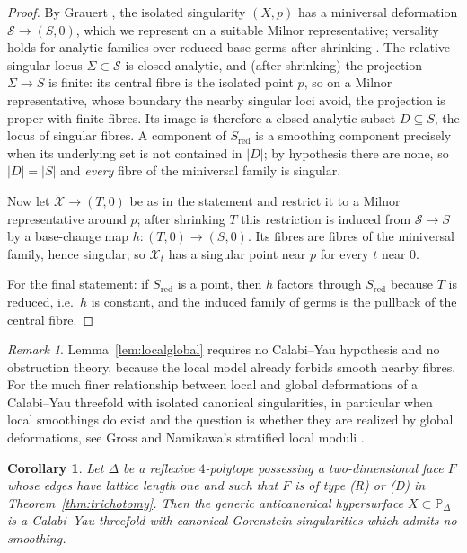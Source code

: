\documentclass[11pt]{amsart}
\newtheorem{corollary}[theorem]{Corollary}
\theoremstyle{definition}
\theoremstyle{remark}
\newtheorem{remark}[theorem]{Remark}
\newcommand{\PP}{\mathbb{P}}
\begin{document}
\begin{proof}
By Grauert \cite{Grauert72}, the isolated singularity $(X,p)$ has a miniversal
deformation $\mathcal{S} \to (S,0)$, which we represent on a suitable Milnor
representative; versality holds for analytic families over reduced base germs
after shrinking \cite[II.1]{GLS}.  The relative singular locus
$\Sigma \subset \mathcal{S}$ is closed analytic, and (after shrinking) the
projection $\Sigma \to S$ is finite: its central fibre is the
isolated point $p$, so on a Milnor representative, whose boundary the
nearby singular loci avoid, the projection is proper with finite
fibres.  Its image is therefore a closed analytic subset
$D \subseteq S$, the locus of singular fibres.  A component of
$S_{\mathrm{red}}$ is a smoothing component precisely when its underlying set is not
contained in $|D|$; by hypothesis there are none, so $|D|=|S|$ and
\emph{every} fibre of the miniversal family is singular.

Now let $\mathcal{X} \to (T,0)$ be as in the statement and restrict it to a
Milnor representative around $p$; after shrinking $T$ this restriction is
induced from $\mathcal{S} \to S$ by a base-change map $h : (T,0) \to (S,0)$.
Its fibres are fibres of the miniversal family, hence singular; so
$\mathcal{X}_t$ has a singular point near $p$ for every $t$ near $0$.

For the final statement: if $S_{\mathrm{red}}$ is a point, then $h$ factors
through $S_{\mathrm{red}}$ because $T$ is reduced, i.e.\ $h$ is constant, and
the induced family of germs is the pullback of the central fibre.
\end{proof}

\begin{remark}
Lemma~\ref{lem:localglobal} requires no Calabi--Yau hypothesis and no
obstruction theory, because the local model already forbids smooth nearby
fibres.  For the much finer relationship between local and global
deformations of a Calabi--Yau threefold with isolated canonical
singularities, in particular when local smoothings do exist and the
question is whether they are realized by global deformations, see Gross
\cite[\S\S1--2]{Gross97} and Namikawa's stratified local moduli
\cite{Namikawa02}.
\end{remark}

\begin{corollary}\label{cor:global}
Let $\Delta$ be a reflexive $4$-polytope possessing a two-dimensional face
$F$ whose edges have lattice length one and such that $F$ is of type
\textup{(R)} or \textup{(D)} in Theorem~\textup{\ref{thm:trichotomy}}.  Then the generic
anticanonical hypersurface $X \subset \PP_\Delta$ is a Calabi--Yau threefold
with canonical Gorenstein singularities which admits no smoothing.
\end{corollary}
\end{document}
